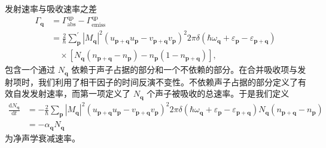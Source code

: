 发射速率与吸收速率之差
\begin{align*}
\Gamma_{\mathbf{q}}&=\Gamma_{\mathrm{abs}}^{\mathrm{qp}}-\Gamma_{\mathrm{emiss}}^{\mathrm{qp}}\\
&=\frac{2}{\hbar}\sum_{\mathbf{p}}^{\prime}\left|M_{\mathbf{q}}\right|^{2}\left(u_{\mathbf{p}+\mathbf{q}}u_{\mathbf{p}}-v_{\mathbf{p}+\mathbf{q}}v_{\mathbf{p}}\right)^{2}2\pi\delta\left(\hbar\omega_{\mathbf{q}}+\varepsilon_{\mathbf{p}}-\varepsilon_{\mathbf{p}+\mathbf{q}}\right)\\
&\quad\times\left[N_{\mathbf{q}}\left(n_{\mathbf{p}+\mathbf{q}}-n_{\mathbf{p}}\right)-n_{\mathbf{p}}\left(1-n_{\mathbf{p}+\mathbf{q}}\right)\right],\tag{12.289}
\end{align*}
包含一个通过 $N_{\mathbf{q}}$ 依赖于声子占据的部分和一个不依赖的部分。在合并吸收项与发射项时，我们利用了相干因子的时间反演不变性。不依赖声子占据的部分定义了有效自发发射速率，而第一项定义了 $N_{\mathbf{q}}$ 个声子被吸收的总速率。于是我们定义
\begin{align*}
\frac{\mathrm{d}N_{\mathbf{q}}}{\mathrm{d}t}&=-\frac{2}{\hbar}\sum_{\mathbf{p}}\left|M_{\mathbf{q}}\right|^{2}\left(u_{\mathbf{p}+\mathbf{q}}u_{\mathbf{p}}-v_{\mathbf{p}+\mathbf{q}}v_{\mathbf{p}}\right)^{2}2\pi\delta\left(\hbar\omega_{\mathbf{q}}+\varepsilon_{\mathbf{p}}-\varepsilon_{\mathbf{p}+\mathbf{q}}\right)N_{\mathbf{q}}\left(n_{\mathbf{p}+\mathbf{q}}-n_{\mathbf{p}}\right)\\
&=-\alpha_{\mathbf{q}}N_{\mathbf{q}}\tag{12.290}
\end{align*}
为净声学衰减速率。

